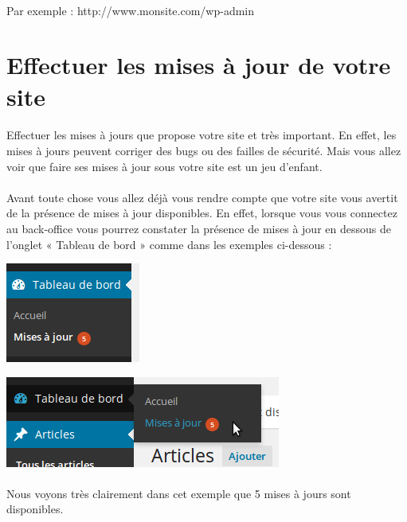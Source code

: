 \documentclass[10pt,a4paper]{article}
\begin{document}
\paragraph{}Par exemple : http://www.monsite.com/wp-admin
\newpage

\section{Effectuer les mises à jour de votre site}
\paragraph{}Effectuer les mises à jours que propose votre site et très important. En effet, les mises à jours peuvent corriger des bugs ou des failles de sécurité. Mais vous allez voir que faire ses mises à jour sous votre site est un jeu d'enfant.
\paragraph{}Avant toute chose vous allez déjà vous rendre compte que votre site vous avertit de la présence de mises à jour disponibles. En effet, lorsque vous vous connectez au back-office vous pourrez constater la présence de mises à jour en dessous de l'onglet « Tableau de bord » comme dans les exemples ci-dessous :
\begin{center}
\includegraphics[scale=0.5]{img/0050.png}
\end{center}
\begin{center}
\includegraphics[scale=0.5]{img/0051.png}
\end{center}
\paragraph{}Nous voyons très clairement dans cet exemple que 5 mises à jours sont disponibles.
\end{document}
